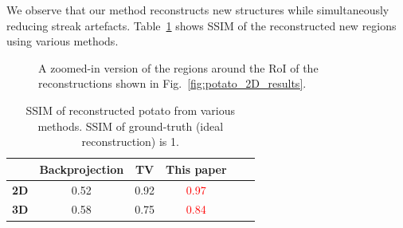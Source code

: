 \documentclass[journal]{IEEEtran}
\begin{document}
We observe
that our method reconstructs new structures while simultaneously
reducing streak artefacts. Table~\ref{table:potato_ssim} shows SSIM of
the reconstructed new regions using various methods.
\begin{figure}[!h]
\centering
{}
\caption{A zoomed-in version of the regions around the RoI of the reconstructions shown in Fig.~\ref{fig:potato_2D_results}.}
\label{fig:potato_zoomed_2D_results}
\end{figure}
\begin{table}[!h]
  \centering
  \caption{SSIM of reconstructed potato from various
    methods. SSIM of ground-truth (ideal reconstruction) is 1.}
\begin{tabular}{|l|c|c|c|c|c|}
\hline &
\textbf{Backprojection} & \textbf{TV} &
\textbf{This paper} \\ \hline \textbf{2D} & 0.52
& 0.92 & \textcolor{red}{0.97} \\ \hline \textbf{3D} & 0.58 & 0.75 & \textcolor{red}{0.84}
\\ \hline
\end{tabular}
\label{table:potato_ssim}
\end{table}
\end{document}
